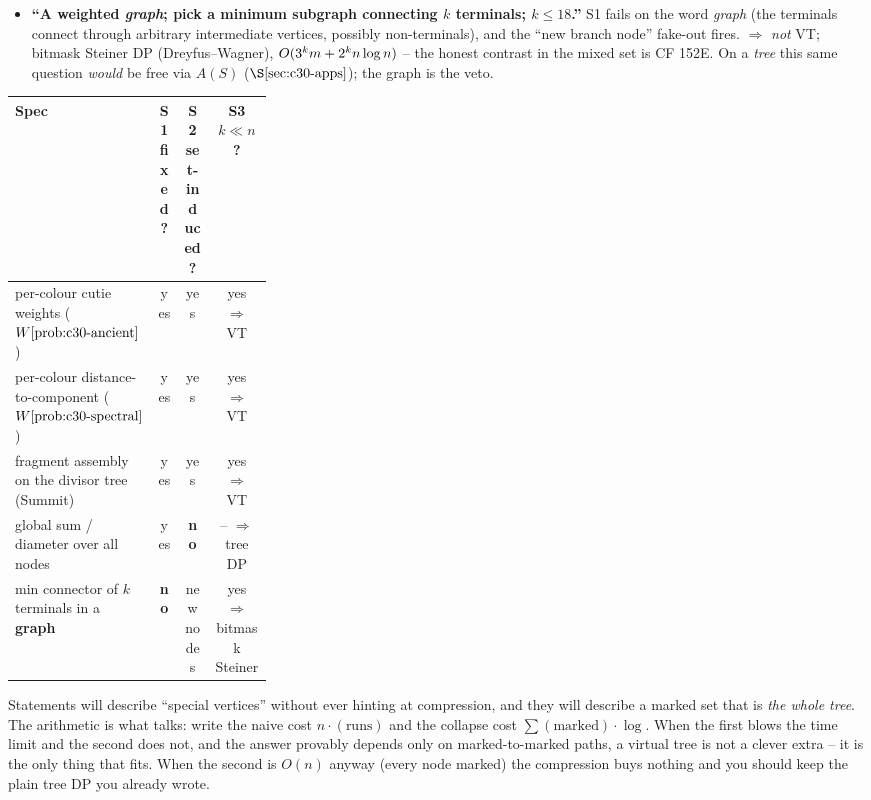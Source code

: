 \begin{itemize}[leftmargin=1.4em]
        This is the trap behind mixed entries like CF 1901E and CF 2253E: a big \(n\),
        a global answer, \emph{no} marked set.
  \item \textbf{``A weighted \emph{graph}; pick a minimum subgraph connecting \(k\)
        terminals; \(k\le 18\).''} S1 fails on the word \emph{graph} (the terminals
        connect through arbitrary intermediate vertices, possibly non-terminals), and
        the ``new branch node'' fake-out fires. \(\Rightarrow\) \emph{not} VT; bitmask
        Steiner DP (Dreyfus--Wagner), \(O(3^k m + 2^k n\log n)\) -- the honest
        contrast in the mixed set is CF 152E. On a \emph{tree} this same question
        \emph{would} be free via \(A(S)\) (\(\secref{c30-apps}\)); the graph is the veto.
\end{itemize}

\begin{comparisonbox}
\setlength{\tabcolsep}{4pt}\renewcommand{\arraystretch}{1.2}%
\begin{tabular}{@{}p{0.30\linewidth}ccc@{}}
\toprule
\textbf{Spec} & \textbf{S1 fixed?} & \textbf{S2 set-induced?} & \textbf{S3 \(k\ll n\)?}\\
\midrule
per-colour cutie weights (\(\probref{c30-ancient}\)) & yes & yes & yes \(\Rightarrow\) VT \\
per-colour distance-to-component (\(\probref{c30-spectral}\)) & yes & yes & yes \(\Rightarrow\) VT \\
fragment assembly on the divisor tree (Summit) & yes & yes & yes \(\Rightarrow\) VT \\
global sum / diameter over all nodes & yes & \textbf{no} & -- \(\Rightarrow\) tree DP \\
min connector of \(k\) terminals in a \textbf{graph} & \textbf{no} & new nodes & yes \(\Rightarrow\) bitmask Steiner \\
\bottomrule
\end{tabular}
\end{comparisonbox}

\begin{insightbox}
Statements will describe ``special vertices'' without ever hinting at compression, and
they will describe a marked set that is \emph{the whole tree}.  The arithmetic is what
talks: write the naive cost \(n\cdot(\text{runs})\) and the collapse cost
\(\sum(\text{marked})\cdot\log\).  When the first blows the time limit and the second
does not, and the answer provably depends only on marked-to-marked paths, a virtual
tree is not a clever extra -- it is the only thing that fits.  When the second is
\(O(n)\) anyway (every node marked) the compression buys nothing and you should keep
the plain tree DP you already wrote.
\end{insightbox}

